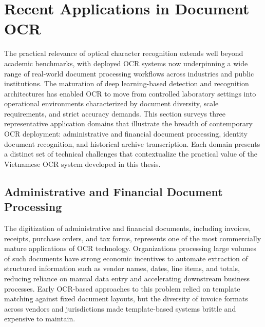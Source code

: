 \section{Recent Applications in Document OCR}

The practical relevance of optical character recognition extends well beyond academic benchmarks, with deployed OCR systems now underpinning a wide range of real-world document processing workflows across industries and public institutions. The maturation of deep learning-based detection and recognition architectures has enabled OCR to move from controlled laboratory settings into operational environments characterized by document diversity, scale requirements, and strict accuracy demands. This section surveys three representative application domains that illustrate the breadth of contemporary OCR deployment: administrative and financial document processing, identity document recognition, and historical archive transcription. Each domain presents a distinct set of technical challenges that contextualize the practical value of the Vietnamese OCR system developed in this thesis.

\subsection{Administrative and Financial Document Processing}
The digitization of administrative and financial documents, including invoices, receipts, purchase orders, and tax forms, represents one of the most commercially mature applications of OCR technology. Organizations processing large volumes of such documents have strong economic incentives to automate extraction of structured information such as vendor names, dates, line items, and totals, reducing reliance on manual data entry and accelerating downstream business processes. Early OCR-based approaches to this problem relied on template matching against fixed document layouts, but the diversity of invoice formats across vendors and jurisdictions made template-based systems brittle and expensive to maintain.

